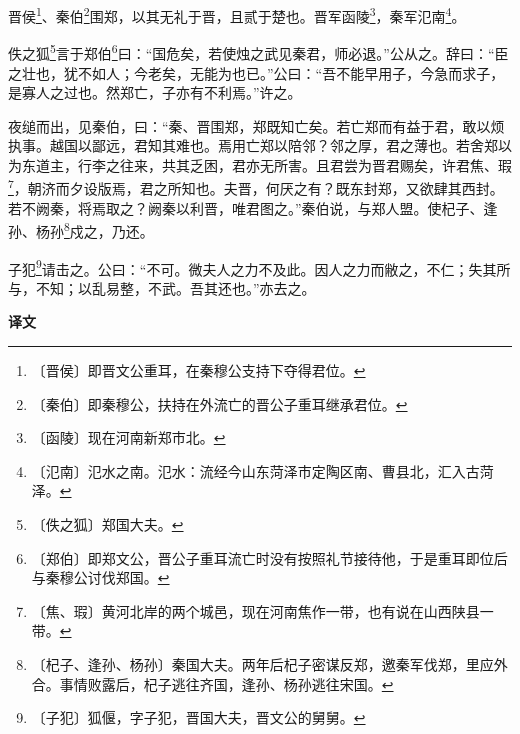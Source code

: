 \documentclass[12pt,UTF-8,openany,a4]{ctexbook}
\begin{document}
\begin{large}
    
    晋侯\footnote{〔晋侯〕\yiwen 即晋文公重耳，在秦穆公支持下夺得君位。}、秦伯\footnote{〔秦伯〕\yiwen 即秦穆公，扶持在外流亡的晋公子重耳继承君位。}围郑，以其无礼于晋，且贰于楚也。晋军函陵\footnote{〔函陵〕\yiwen 现在河南新郑市北。}，秦军氾南\footnote{〔氾南〕\yiwen 氾水之南。氾水：流经今山东菏泽市定陶区南、曹县北，汇入古菏泽。}。
    
    佚之狐\footnote{〔佚之狐〕\yiwen 郑国大夫。}言于郑伯\footnote{〔郑伯〕\yiwen 即郑文公，晋公子重耳流亡时没有按照礼节接待他，于是重耳即位后与秦穆公讨伐郑国。}曰：“国危矣，若使烛之武见秦君，师必退。”公从之。辞曰：“臣之壮也，犹不如人；今老矣，无能为也已。”公曰：“吾不能早用子，今急而求子，是寡人之过也。然郑亡，子亦有不利焉。”许之。
    
    夜缒而出，见秦伯，曰：“秦、晋围郑，郑既知亡矣。若亡郑而有益于君，敢以烦执事。越国以鄙远，君知其难也。焉用亡郑以陪邻？邻之厚，君之薄也。若舍郑以为东道主，行李之往来，共其乏困，君亦无所害。且君尝为晋君赐矣，许君焦、瑕\footnote{〔焦、瑕〕\yiwen 黄河北岸的两个城邑，现在河南焦作一带，也有说在山西陕县一带。}，朝济而夕设版焉，君之所知也。夫晋，何厌之有？既东封郑，又欲肆其西封。若不阙秦，将焉取之？阙秦以利晋，唯君图之。”秦伯说，与郑人盟。使杞子、逢孙、杨孙\footnote{〔杞子、逢孙、杨孙〕\yiwen 秦国大夫。两年后杞子密谋反郑，邀秦军伐郑，里应外合。事情败露后，杞子逃往齐国，逢孙、杨孙逃往宋国。}戍之，乃还。
    
    子犯\footnote{〔子犯〕\yiwen 狐偃，字子犯，晋国大夫，晋文公的舅舅。}请击之。公曰：“不可。微夫人之力不及此。因人之力而敝之，不仁；失其所与，不知；以乱易整，不武。吾其还也。”亦去之。
\end{large}


\newpage

\begin{Large}
    \noindent\textbf{译文}
\end{Large}


\vspace{1em}
\end{document}
